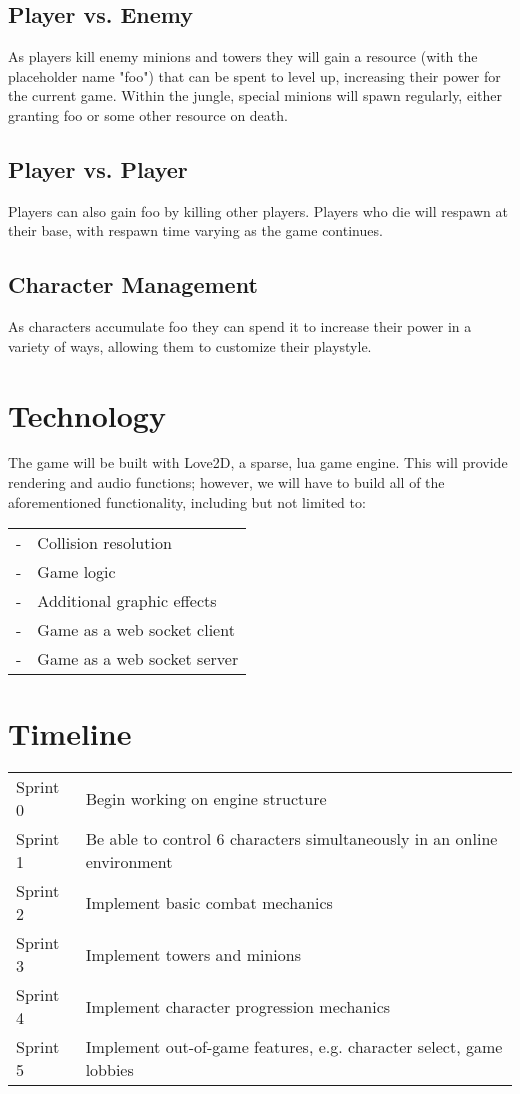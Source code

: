 \documentclass[10pt]{article}
\begin{document}
		\subsection{Player vs. Enemy}
			As players kill enemy minions and towers they will gain a resource (with the placeholder name "foo") that can be spent to level up, increasing their power for the current game. Within the jungle, special minions will spawn regularly, either granting foo or some other resource on death.
			
		\subsection{Player vs. Player}
			Players can also gain foo by killing other players. Players who die will respawn at their base, with respawn time varying as the game continues.
		
		\subsection{Character Management}
			As characters accumulate foo they can spend it to increase their power in a variety of ways, allowing them to customize their playstyle.
		
	\section{Technology}
		The game will be built with Love2D, a sparse, lua game engine. This will provide rendering and audio functions; however, we will have to build all of the aforementioned functionality, including but not limited to:\\
		\begin{tabular} {ll}
			-&Collision resolution\\
			-&Game logic\\
			-&Additional graphic effects\\
			-&Game as a web socket client\\
			-&Game as a web socket server\\
		\end{tabular}
		
			
	\section{Timeline}
		\begin{tabular} {ll}
			Sprint 0& Begin working on engine structure\\
			Sprint 1& Be able to control 6 characters simultaneously in an online environment\\
			Sprint 2& Implement basic combat mechanics\\
			Sprint 3& Implement towers and minions\\
			Sprint 4& Implement character progression mechanics\\
			Sprint 5& Implement out-of-game features, e.g. character select, game lobbies\\
		\end{tabular}
		
\end{document}
